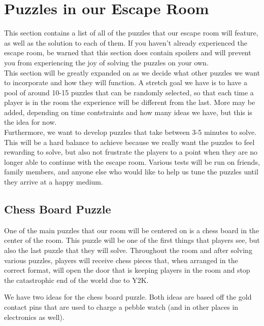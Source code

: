 \documentclass[conference]{IEEEtran}
\begin{document}
\section{Puzzles in our Escape Room}
This section contains a list of all of the puzzles that our escape room will feature, as well as
the solution to each of them. If you haven't already experienced the escape room, be warned that
this section does contain spoilers and will prevent you from experiencing the joy of solving the
puzzles on your own.
\\
\indent This section will be greatly expanded on as we decide what other puzzles we want to incorporate and how they will function.
A stretch goal we have is to have a pool of around 10-15 puzzles that can be randomly selected, so that each time a player is in the
room the experience will be different from the last. More may be added, depending on time contstraints and how many ideas we
have, but this is the idea for now.
\\
\indent Furthermore, we want to develop puzzles that take between 3-5 minutes to solve. This will be a hard balance
to achieve because we really want the puzzles to feel rewarding to solve, but also not frustrate the players
to a point when they are no longer able to continue with the escape room. Various tests will be run on friends, family members,
and anyone else who would like to help us tune the puzzles until they arrive at a happy medium.


\subsection{Chess Board Puzzle}
One of the main puzzles that our room will be centered on is a chess board in the center of the room.
This puzzle will be one of the first things that players see, but also the last puzzle that they will solve.
Throughout the room and after solving various puzzles, players will receive chess pieces that, when
arranged in the correct format, will open the door that is keeping players in the room and stop the
catastrophic end of the world due to Y2K.

We have two ideas for the chess board puzzle. Both ideas are based off the gold contact pins that are used
to charge a pebble watch (and in other places in electronics as well).
\end{document}

